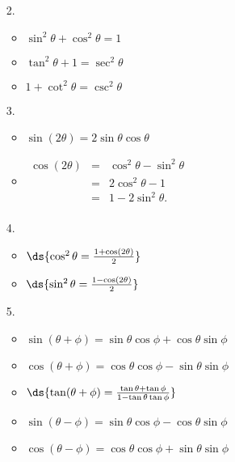 \begin{multicols}{2}
\begin{enumerate}
\item[2.] 
\begin{itemize}
	\item  $\sin ^2 \theta + \cos ^2 \theta = 1$
	\item $\tan^2 \theta + 1 = \sec^2 \theta$
	\item $1 + \cot ^2 \theta = \csc^2 \theta$
\end{itemize}

\item[3.] 
\begin{itemize}
	\item $\sin(2\theta) = 2\sin\theta\cos\theta$
	\item $\begin{array}{rcl}
  \cos(2\theta) &= &\cos^2\theta - \sin^2\theta\\
 ~ &= &2\cos^2\theta - 1\\
~  &= &1-2\sin^2\theta.\\
\end{array}$
\end{itemize}

\item[4.] 
\begin{itemize}
	\item $\ds{\cos^2\theta = \frac{1+\cos(2\theta)}{2}}$
	\item $\ds{\sin^2\theta = \frac{1-\cos(2\theta)}{2}}$
\end{itemize}

\item[5.] 
\begin{itemize}
	\item $\sin(\theta+\phi) = \sin\theta\cos\phi + \cos\theta\sin\phi$
	\item $\cos(\theta+\phi) = \cos\theta\cos\phi - \sin\theta\sin\phi$
	\item $\ds{\tan(\theta+\phi) = \frac{\tan\theta + \tan\phi}{1 - \tan\theta\tan\phi}}$
	\item	$\sin(\theta-\phi) = \sin\theta\cos\phi - \cos\theta\sin\phi$
	\item	$\cos(\theta-\phi) = \cos\theta\cos\phi + \sin\theta\sin\phi$
\end{itemize}
\end{enumerate}
\end{multicols}

